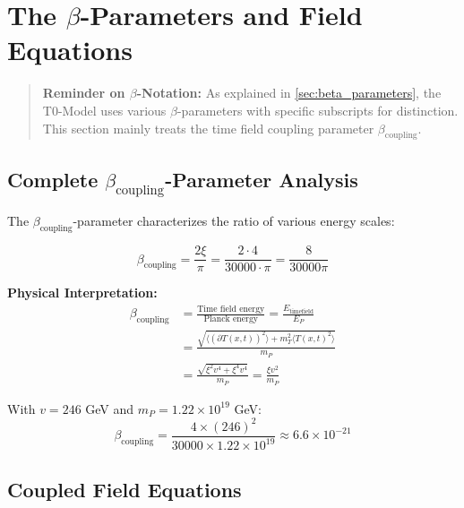 \documentclass[12pt,a4paper]{report}
\newcommand{\Tfield}{T(x,t)}  %
\newcommand{\xipar}{\xi}      %
\begin{document}
	\section{The $\beta$-Parameters and Field Equations}\label{sec:beta_parameters_field_equations}
	
	\begin{quote}
		\textbf{Reminder on $\beta$-Notation:} As explained in \autoref{sec:beta_parameters}, the T0-Model uses various $\beta$-parameters with specific subscripts for distinction. This section mainly treats the time field coupling parameter $\beta_{\text{coupling}}$.
	\end{quote}
	
	\subsection{Complete $\beta_{\text{coupling}}$-Parameter Analysis}\label{subsec:complete_beta_analysis}
	
	The $\beta_{\text{coupling}}$-parameter characterizes the ratio of various energy scales:
	
	\begin{equation}\label{eq:beta_parameter_complete}
		\beta_{\text{coupling}} = \frac{2\xipar}{\pi} = \frac{2 \cdot 4}{30000 \cdot \pi} = \frac{8}{30000\pi}
	\end{equation}
	
	\textbf{Physical Interpretation:}
	\begin{align}
		\beta_{\text{coupling}} &= \frac{\text{Time field energy}}{\text{Planck energy}} = \frac{E_{\text{timefield}}}{E_P} \\
		&= \frac{\sqrt{\langle (\partial \Tfield)^2 \rangle + m_T^2 \langle \Tfield^2 \rangle}}{m_P} \\
		&= \frac{\sqrt{\xipar^2 v^4 + \xipar^4 v^4}}{m_P} = \frac{\xipar v^2}{m_P}
	\end{align}
	
	With $v = 246$ GeV and $m_P = 1.22 \times 10^{19}$ GeV:
	\begin{equation}
		\beta_{\text{coupling}} = \frac{4 \times (246)^2}{30000 \times 1.22 \times 10^{19}} \approx 6.6 \times 10^{-21}
	\end{equation}
	
	\subsection{Coupled Field Equations}\label{subsec:coupled_field_equations}
	
\end{document}
